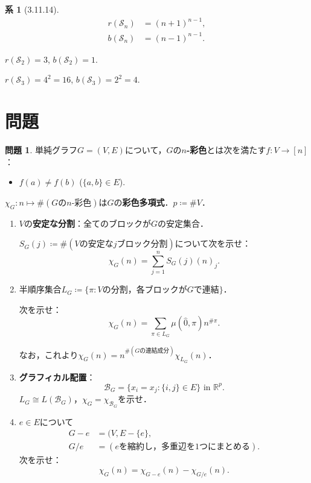 \documentclass[xelatex,ja=standard,a4paper,14pt,everyparhook=compat]{bxjsarticle}
\newcommand{\bbR}{\mathbb{R}}
\newcommand{\mcB}{\mathcal{B}}
\newcommand{\mcS}{\mathcal{S}}
\theoremstyle{definition}
\newtheorem*{corollary}{系}
\newtheorem{problem}{問題}
\begin{document}
\begin{corollary}[3.11.14]
    \begin{align*}
        r(\mcS_n) & = (n+1)^{n-1}, \\
        b(\mcS_n) & = (n-1)^{n-1}.
    \end{align*}
\end{corollary}

$r(\mcS_2) = 3$, $b(\mcS_2) = 1$.

$r(\mcS_3) = 4^2 = 16$, $b(\mcS_3) = 2^2 = 4$.

\section{問題}

\setcounter{problem}{107}
\begin{problem}
単純グラフ$G = (V,E)$について，$G$の\textbf{$n$-彩色}とは次を満たす$f: V \to [n]$： \begin{itemize}
    \item $f(a) \neq f(b)$ ($\{a,b\} \in E$).
\end{itemize}
$\chi_G: n \mapsto \#(\text{$G$の$n$-彩色})$は$G$の\textbf{彩色多項式}．$p \coloneqq \#V$．

\begin{enumerate}[label=\alph*.]
    \item $V$の\textbf{安定な分割}：全てのブロックが$G$の安定集合．

          $S_G(j) \coloneqq \#(\text{$V$の安定な$j$ブロック分割})$について次を示せ： \begin{equation*}
              \chi_G(n) = \sum_{j=1}^n S_G(j) (n)_j.
          \end{equation*}
    \item 半順序集合$L_G \coloneqq \{\pi : \text{$V$の分割，各ブロックが$G$で連結}\}$．

          次を示せ： \begin{equation*}
              \chi_G(n) = \sum_{\pi \in L_G} \mu(\hat0, \pi) n^{\#\pi}.
          \end{equation*}

          なお，これより$\chi_G(n) = n^{\#(\text{$G$の連結成分})} \chi_{L_G}(n)$．
    \item \textbf{グラフィカル配置}： \begin{equation*}
        \mcB_G = \text{$\{x_i = x_j : \{i,j\} \in E\}$ in $\bbR^p$}.
    \end{equation*}
    $L_G \cong L(\mcB_G)$，$\chi_G = \chi_{\mcB_G}$を示せ．
    \item $e \in E$について \begin{align*}
        G - e &= (V, E - \{e\}, \\
        G/e &= (\text{$e$を縮約し，多重辺を$1$つにまとめる}).
    \end{align*}
    次を示せ： \begin{equation*}
        \chi_G(n) = \chi_{G-e}(n) - \chi_{G/e}(n).
    \end{equation*}
\end{enumerate}
\end{problem}
\end{document}
